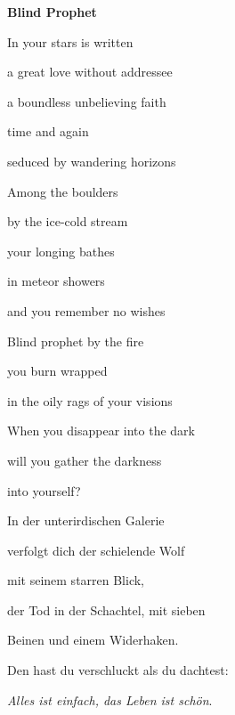 \bigskip


\bigskip


\bigskip


\bigskip


\bigskip


\bigskip


\bigskip


\bigskip


\bigskip


\bigskip


\bigskip

{\bfseries
Blind Prophet}


\bigskip


\bigskip

In your stars is written

a great love without addressee

a boundless unbelieving faith

time and again 

seduced by wandering horizons


\bigskip

Among the boulders

by the ice-cold stream

your longing bathes 

in meteor showers

and you remember no wishes


\bigskip

Blind prophet by the fire

you burn wrapped 

in the oily rags of your visions


\bigskip

When you disappear into the dark

will you gather the darkness 

into yourself?


\bigskip



\bigskip


\bigskip

In der unterirdischen Galerie 

verfolgt dich der schielende Wolf

mit seinem starren Blick,

der Tod in der Schachtel, mit sieben 

Beinen und einem Widerhaken. 

Den hast du verschluckt als du dachtest:

\emph{Alles ist einfach, das Leben ist schön}.

